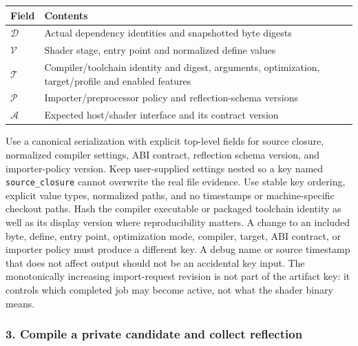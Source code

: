 {\def\LTcaptype{none} %
\begin{longtable}[]{@{}
  >{\raggedright\arraybackslash}p{}
  >{\raggedright\arraybackslash}p{}@{}}
\toprule\noalign{}
\begin{minipage}[b]{\linewidth}\raggedright
Field
\end{minipage} & \begin{minipage}[b]{\linewidth}\raggedright
Contents
\end{minipage} \\
\midrule\noalign{}
\endhead
\bottomrule\noalign{}
\endlastfoot
\(\mathcal D\) & Actual dependency identities and snapshotted byte digests \\
\(\mathcal V\) & Shader stage, entry point and normalized define values \\
\(\mathcal T\) & Compiler/toolchain identity and digest, arguments, optimization, target/profile and enabled features \\
\(\mathcal P\) & Importer/preprocessor policy and reflection-schema versions \\
\(\mathcal A\) & Expected host/shader interface and its contract version \\
\end{longtable}
}

Use a canonical serialization with explicit top-level fields for source closure, normalized compiler settings, ABI contract, reflection schema version, and importer-policy version. Keep user-supplied settings nested so a key named \texttt{source\_closure} cannot overwrite the real file evidence. Use stable key ordering, explicit value types, normalized paths, and no timestamps or machine-specific checkout paths. Hash the compiler executable or packaged toolchain identity as well as its display version where reproducibility matters. A change to an included byte, define, entry point, optimization mode, compiler, target, ABI contract, or importer policy must produce a different key. A debug name or source timestamp that does not affect output should not be an accidental key input. The monotonically increasing import-request revision is not part of the artifact key: it controls which completed job may become active, not what the shader binary means.

\subsubsection{3. Compile a private candidate and collect reflection}\label{05-engine-i-ch010-compile-a-private-candidate-and-collect-reflection}

